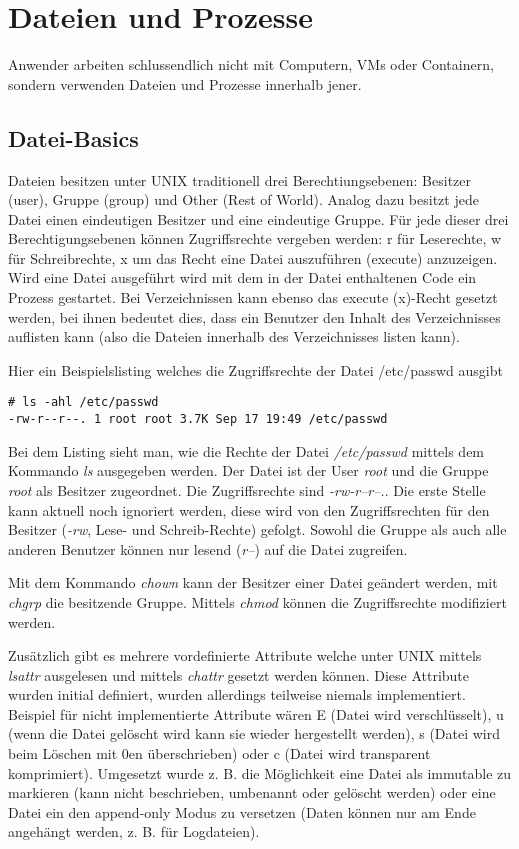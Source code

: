 \chapter{Dateien und Prozesse}

Anwender arbeiten schlussendlich nicht mit Computern, VMs oder Containern, sondern verwenden Dateien und Prozesse innerhalb jener.

\section{Datei-Basics}

Dateien besitzen unter UNIX traditionell drei Berechtiungsebenen: Besitzer (user), Gruppe (group) und Other (Rest of World). Analog dazu besitzt jede Datei einen eindeutigen Besitzer und eine eindeutige Gruppe. Für jede dieser drei Berechtigungsebenen können Zugriffsrechte vergeben werden: r für Leserechte, w für Schreibrechte, x um das Recht eine Datei auszuführen (execute) anzuzeigen. Wird eine Datei ausgeführt wird mit dem in der Datei enthaltenen Code ein Prozess gestartet. Bei Verzeichnissen kann ebenso das execute (x)-Recht gesetzt werden, bei ihnen bedeutet dies, dass ein Benutzer den Inhalt des Verzeichnisses auflisten kann (also die Dateien innerhalb des Verzeichnisses listen kann).

Hier ein Beispielslisting welches die Zugriffsrechte der Datei /etc/passwd ausgibt

\begin{verbatim}
# ls -ahl /etc/passwd                        
-rw-r--r--. 1 root root 3.7K Sep 17 19:49 /etc/passwd
\end{verbatim}

Bei dem Listing sieht man, wie die Rechte der Datei \textit{/etc/passwd} mittels dem Kommando \textit{ls} ausgegeben werden. Der Datei ist der User \textit{root} und die Gruppe \textit{root} als Besitzer zugeordnet. Die Zugriffsrechte sind \textit{-rw-r--r--.}. Die erste Stelle kann aktuell noch ignoriert werden, diese wird von den Zugriffsrechten für den Besitzer (\textit{-rw}, Lese- und Schreib-Rechte) gefolgt. Sowohl die Gruppe als auch alle anderen Benutzer können nur lesend (\textit{r--}) auf die Datei zugreifen.

Mit dem Kommando \textit{chown} kann der Besitzer einer Datei geändert werden, mit \textit{chgrp} die besitzende Gruppe. Mittels \textit{chmod} können die Zugriffsrechte modifiziert werden.

Zusätzlich gibt es mehrere vordefinierte Attribute welche unter UNIX mittels \textit{lsattr} ausgelesen und mittels \textit{chattr} gesetzt werden können. Diese Attribute wurden initial definiert, wurden allerdings teilweise niemals implementiert. Beispiel für nicht implementierte Attribute wären E (Datei wird verschlüsselt), u (wenn die Datei gelöscht wird kann sie wieder hergestellt werden), s (Datei wird beim Löschen mit 0en überschrieben) oder c (Datei wird transparent komprimiert). Umgesetzt wurde z. B. die Möglichkeit eine Datei als immutable zu markieren (kann nicht beschrieben, umbenannt oder gelöscht werden) oder eine Datei ein den append-only Modus zu versetzen (Daten können nur am Ende angehängt werden, z. B. für Logdateien).

